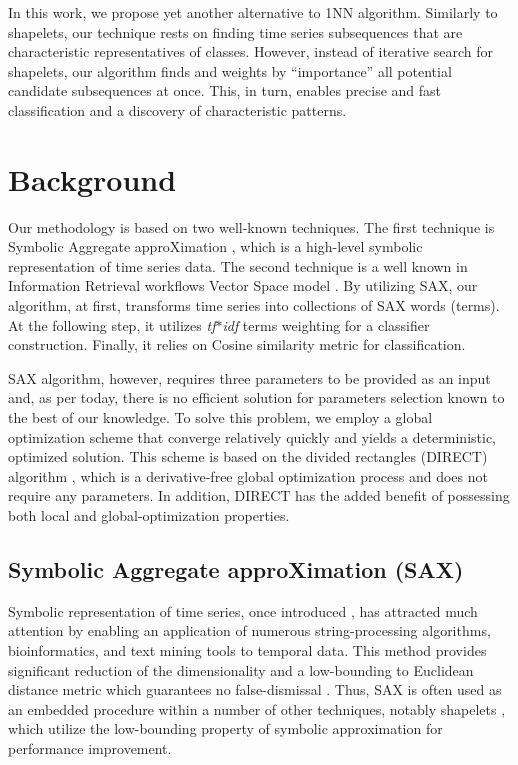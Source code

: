 \documentclass{llncs}
\begin{document}
In this work, we propose yet another alternative to 1NN algorithm. Similarly to shapelets, our
technique rests on finding time series subsequences that are characteristic representatives of
classes. However, instead of iterative search for shapelets, our algorithm finds and weights by
``importance'' all potential candidate subsequences at once. This, in turn, enables precise and fast
classification and a discovery of characteristic patterns.

\section{Background}
Our methodology is based on two well-known techniques. The first technique is Symbolic Aggregate
approXimation \cite{sax}, which is a high-level symbolic representation of time series
data. The second technique is a well known in Information Retrieval workflows Vector Space 
model \cite{salton}. By utilizing SAX, our algorithm, at first, transforms time series into
collections of SAX words (terms). 
At the following step, it utilizes \textit{tf$\ast$idf} terms weighting for  a classifier
construction. 
Finally, it relies on Cosine similarity metric for classification.

SAX algorithm, however, requires three parameters to be provided as an input and, as per today,
there is no efficient solution for parameters selection known to the best of our knowledge. 
To solve this problem, we employ a global optimization scheme that converge relatively quickly 
and yields a deterministic, optimized solution. 
This scheme is based on the divided rectangles (DIRECT) algorithm \cite{direct}, which is
a derivative-free global optimization process and does not require any parameters.
In addition, DIRECT has the added benefit of possessing both local and global-optimization
properties. 

\subsection{Symbolic Aggregate approXimation (SAX)}
Symbolic representation of time series, once introduced \cite{sax}, has attracted much attention by
enabling an application of numerous string-processing algorithms, bioinformatics, and text mining 
tools to temporal data. This method provides significant reduction of the dimensionality and
a low-bounding to Euclidean distance metric which guarantees no false-dismissal \cite{hot_sax}.
Thus, SAX is often used as an embedded procedure within a number of other techniques, notably 
shapelets \cite{fast-shapelets}, which utilize the low-bounding property of symbolic approximation 
for performance improvement.
\end{document}
